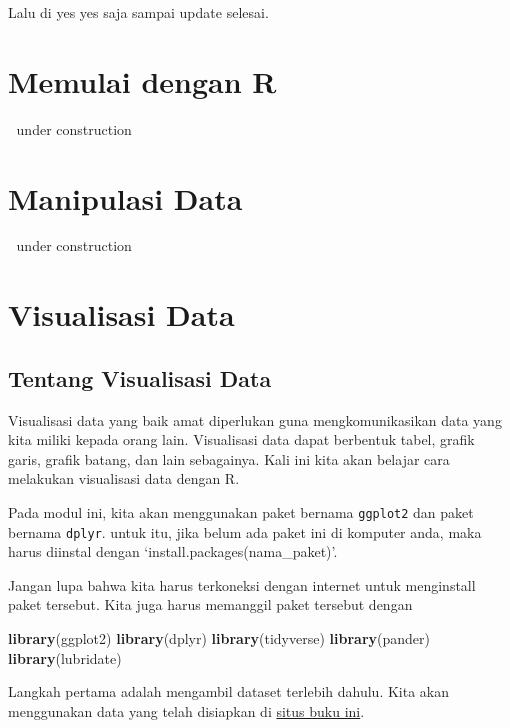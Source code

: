 \documentclass[
]{book}
\newenvironment{Shaded}{\begin{snugshade}}{\end{snugshade}}
\newcommand{\KeywordTok}[1]{\textcolor[rgb]{0.13,0.29,0.53}{\textbf{#1}}}
\newcommand{\NormalTok}[1]{#1}
\begin{document}
Lalu di yes yes saja sampai update selesai.

\hypertarget{intro}{%
\chapter{Memulai dengan R}\label{intro}}

🚧 under construction 🚧

\hypertarget{manipulasi-data}{%
\chapter{Manipulasi Data}\label{manipulasi-data}}

🚧 under construction 🚧

\hypertarget{visualisasi-data}{%
\chapter{Visualisasi Data}\label{visualisasi-data}}

\hypertarget{tentang-visualisasi-data}{%
\section{Tentang Visualisasi Data}\label{tentang-visualisasi-data}}

Visualisasi data yang baik amat diperlukan guna mengkomunikasikan data yang kita miliki kepada orang lain. Visualisasi data dapat berbentuk tabel, grafik garis, grafik batang, dan lain sebagainya. Kali ini kita akan belajar cara melakukan visualisasi data dengan R.

Pada modul ini, kita akan menggunakan paket bernama \texttt{ggplot2} dan paket bernama \texttt{dplyr}. untuk itu, jika belum ada paket ini di komputer anda, maka harus diinstal dengan `install.packages(nama\_paket)'.

Jangan lupa bahwa kita harus terkoneksi dengan internet untuk menginstall paket tersebut. Kita juga harus memanggil paket tersebut dengan

\begin{Shaded}
\begin{Highlighting}[]
\KeywordTok{library}\NormalTok{(ggplot2)}
\KeywordTok{library}\NormalTok{(dplyr)}
\KeywordTok{library}\NormalTok{(tidyverse)}
\KeywordTok{library}\NormalTok{(pander)}
\KeywordTok{library}\NormalTok{(lubridate)}
\end{Highlighting}
\end{Shaded}

Langkah pertama adalah mengambil dataset terlebih dahulu. Kita akan menggunakan data yang telah disiapkan di \href{https://imedkrisna.github.io/r/docs/index.html}{situs buku ini}.
\end{document}
